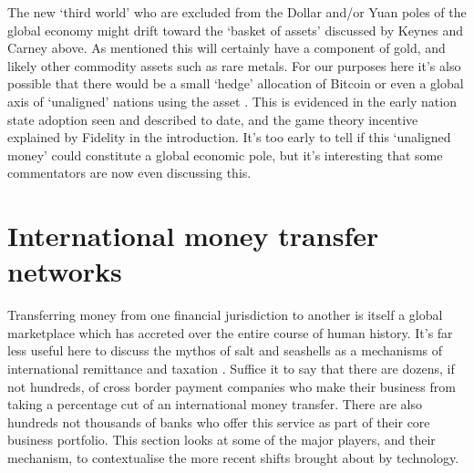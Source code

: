 The new `third world' who are excluded from the Dollar and/or Yuan poles of the global economy might drift toward the `basket of assets' discussed by Keynes and Carney above. As mentioned this will certainly have a component of gold, and likely other commodity assets such as rare metals. For our purposes here it's also possible that there would be a small `hedge' allocation of Bitcoin or even a global axis of `unaligned' nations using the asset \cite{hendrickson2021value}. This is evidenced in the early nation state adoption seen and described to date, and the game theory incentive explained by Fidelity in the introduction. It's too early to tell if this `unaligned money' could constitute a global economic pole, but it's interesting that some commentators are now even discussing this.

\section{International money transfer networks}
Transferring money from one financial jurisdiction to another is itself a global marketplace which has accreted over the entire course of human history. It's far less useful here to discuss the mythos of salt and seashells as a mechanisms of international remittance and taxation \cite{gainsford2017salt, goldberg2005famous}. Suffice it to say that there are dozens, if not hundreds, of cross border payment companies who make their business from taking a percentage cut of an international money transfer. There are also hundreds not thousands of banks who offer this service as part of their core business portfolio. This section looks at some of the major players, and their mechanism, to contextualise the more recent shifts brought about by technology.
